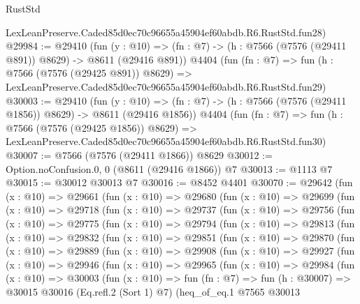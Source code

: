 \begin{lexlean}{RustStd}
\begin{coremodule}
    LexLeanPreserve.Caded85d0ec70c96655a45904ef60abdb.R6.RustStd.fun28)
@29984 := @29410
    (fun (y : @10) => (fn : @7) -> (h : @7566 (@7576 (@29411 @891)) @8629) -> @8611 (@29416 @891))
    @4404
    (fun (fn : @7) =>
    fun (h : @7566 (@7576 (@29425 @891)) @8629) =>
    LexLeanPreserve.Caded85d0ec70c96655a45904ef60abdb.R6.RustStd.fun29)
@30003 := @29410
    (fun (y : @10) => (fn : @7) -> (h : @7566 (@7576 (@29411 @1856)) @8629) -> @8611 (@29416 @1856))
    @4404
    (fun (fn : @7) =>
    fun (h : @7566 (@7576 (@29425 @1856)) @8629) =>
    LexLeanPreserve.Caded85d0ec70c96655a45904ef60abdb.R6.RustStd.fun30)
@30007 := @7566 (@7576 (@29411 @1866)) @8629
@30012 := Option.noConfusion.{0, 0} (@8611 (@29416 @1866)) @7
@30013 := @1113 @7
@30015 := @30012 @30013 @7
@30016 := @8452 @4401
@30070 := @29642
    (fun (x : @10) =>
    @29661
      (fun (x : @10) =>
      @29680
        (fun (x : @10) =>
        @29699
          (fun (x : @10) =>
          @29718
            (fun (x : @10) =>
            @29737
              (fun (x : @10) =>
              @29756
                (fun (x : @10) =>
                @29775
                  (fun (x : @10) =>
                  @29794
                    (fun (x : @10) =>
                    @29813
                      (fun (x : @10) =>
                      @29832
                        (fun (x : @10) =>
                        @29851
                          (fun (x : @10) =>
                          @29870
                            (fun (x : @10) =>
                            @29889
                              (fun (x : @10) =>
                              @29908
                                (fun (x : @10) =>
                                @29927
                                  (fun (x : @10) =>
                                  @29946
                                    (fun (x : @10) =>
                                    @29965
                                      (fun (x : @10) =>
                                      @29984
                                        (fun (x : @10) =>
                                        @30003
                                          (fun (x : @10) =>
                                          fun (fn : @7) =>
                                          fun (h : @30007) =>
                                          @30015
                                            @30016
                                            (Eq.refl.{2} (Sort 1) @7)
                                            (heq_of_eq.{1}
                                              @7565
                                              @30013

\end{coremodule}
\end{lexlean}
